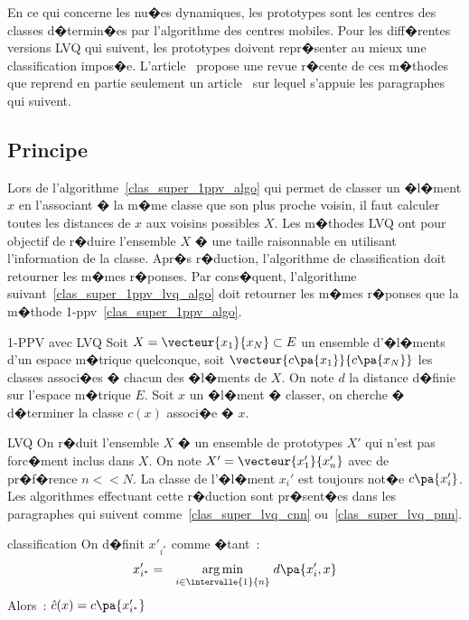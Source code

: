 En ce qui concerne les nu�es dynamiques, les prototypes sont les centres des classes d�termin�es par l'algorithme des centres mobiles. Pour les diff�rentes versions LVQ qui suivent, les prototypes doivent repr�senter au mieux une classification impos�e. L'article~ propose une revue r�cente de ces m�thodes que reprend en partie seulement un article~ sur lequel s'appuie les paragraphes qui suivent.



\subsection{Principe}
\label{clas_super_principe_lvq}

Lors de l'algorithme~\ref{clas_super_1ppv_algo} qui permet de classer un �l�ment $x$ en l'associant � la m�me classe que son plus proche voisin, il faut calculer toutes les distances de $x$ aux voisins possibles $X$. Les m�thodes LVQ ont pour objectif de r�duire l'ensemble $X$ � une taille raisonnable en utilisant l'information de la classe. Apr�s r�duction, l'algorithme de classification doit retourner les m�mes r�ponses. Par cons�quent, l'algorithme suivant~\ref{clas_super_1ppv_lvq_algo} doit retourner les m�mes r�ponses que la m�thode 1-ppv~\ref{clas_super_1ppv_algo}.



        \begin{xalgorithm}{1-PPV avec LVQ}
        \label{clas_super_1ppv_lvq_algo}
        Soit $X = \vecteur{x_1}{x_N} \subset E$ un ensemble d'�l�ments d'un espace m�trique quelconque, 
        soit $\vecteur{c\pa{x_1}}{c\pa{x_N}}$ les classes associ�es � chacun des �l�ments de $X$. On note 
        $d$ la distance d�finie sur l'espace m�trique $E$. Soit $x$
        un �l�ment � classer, on cherche � d�terminer la classe $c(x)$ associ�e � $x$.
        
        \begin{xalgostep}{LVQ}\label{clas_super_lvq_step_identity}
        On r�duit l'ensemble $X$ � un ensemble de prototypes $X'$ qui n'est pas forc�ment
        inclus dans $X$. On note $X' = \vecteur{x'_1}{x'_n}$ avec de pr�f�rence $n << N$.
        La classe de l'�l�ment $x_i'$ est toujours not�e $c\pa{x'_i}$. Les algorithmes effectuant 
        cette r�duction sont pr�sent�es dans les paragraphes qui suivent comme~\ref{clas_super_lvq_cnn}
        ou~\ref{clas_super_lvq_pnn}.
        \end{xalgostep}
        
        \begin{xalgostep}{classification}\label{clas_super_lvq_step_clas_b}
        On d�finit $x'_{i^*}$ comme �tant~:
                        \begin{eqnarray*}
                        x'_{i^*} &=& \underset{i \in \intervalle{1}{n}}{\arg \min} \; d\pa{x'_i,x}
                        \end{eqnarray*}
        Alors~: $\hat{c}(x) = c\pa{x'_{i^*}}$
        \end{xalgostep}
        \end{xalgorithm}

